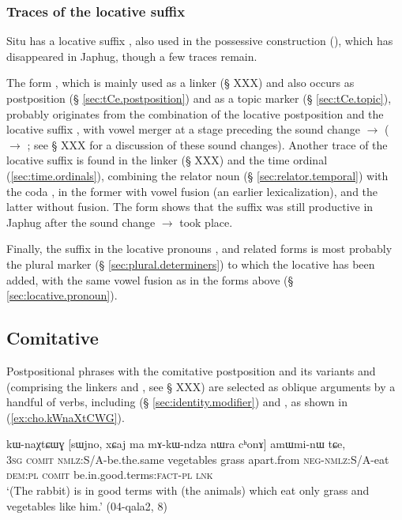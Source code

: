 \subsubsection{Traces of the locative suffix } \label{sec:locative.j}
Situ has a locative suffix , also used in the possessive construction (\citealt[325-330]{linxr93jiarongen}), which has disappeared in Japhug, though a few traces remain.

The form , which is mainly used as a linker (§ XXX) and also occurs as postposition (§ \ref{sec:tCe.postposition}) and as a topic marker (§ \ref{sec:tCe.topic}), probably originates from the combination of the locative postposition  and the locative suffix , with vowel merger at a stage preceding the sound change  $\rightarrow$   ( $\rightarrow$ ; see § XXX for a discussion of these sound changes).
Another trace of the locative suffix  is found in the linker  (§ XXX) and the time ordinal  (\ref{sec:time.ordinals}), combining the relator noun  (§ \ref{sec:relator.temporal}) with the coda , in the former with vowel fusion (an earlier lexicalization), and the latter without fusion. The form    shows that the suffix  was still productive in Japhug after the sound change  $\rightarrow$  took place.

Finally, the suffix  in the locative pronouns ,  and related forms is most probably the plural marker  (§ \ref{sec:plural.determiners}) to which the locative  has been added, with the same vowel fusion as in the forms above (§ \ref{sec:locative.pronoun}).


\subsection{Comitative} \label{sec:comitative} 
Postpositional phrases with the comitative postposition  and its variants  and  (comprising the linkers  and , see § XXX) are selected as oblique arguments by a handful of verbs, including  (§ \ref{sec:identity.modifier}) and , as shown in (\ref{ex:cho.kWnaXtCWG}).

\begin{exe}
\ex \label{ex:cho.kWnaXtCWG}
 kɯ-naχtɕɯɣ [sɯjno, xɕaj ma mɤ-kɯ-ndza nɯra cʰonɤ] amɯmi-nɯ tɕe, \\
\textsc{3sg} \textsc{comit} \textsc{nmlz}:S/A-be.the.same vegetables grass apart.from \textsc{neg}-\textsc{nmlz}:S/A-eat \textsc{dem}:\textsc{pl} \textsc{comit} be.in.good.terms:\textsc{fact}-\textsc{pl} \textsc{lnk} \\
\glt `(The rabbit) is in good terms with (the animals) which eat only grass and vegetables like him.' (04-qala2, 8)
\end{exe}

